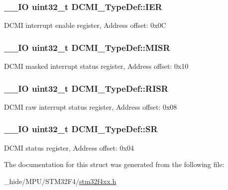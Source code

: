 \subsubsection[{I\+E\+R}]{\setlength{\rightskip}{0pt plus 5cm}\+\_\+\+\_\+\+I\+O uint32\+\_\+t D\+C\+M\+I\+\_\+\+Type\+Def\+::\+I\+E\+R}\label{struct_d_c_m_i___type_def_a91ce93b57d8382147574c678ee497c63}
D\+C\+M\+I interrupt enable register, Address offset\+: 0x0\+C \hypertarget{struct_d_c_m_i___type_def_ab367c4ca2e8ac87238692e6d55d622ec}{}
\subsubsection[{M\+I\+S\+R}]{\setlength{\rightskip}{0pt plus 5cm}\+\_\+\+\_\+\+I\+O uint32\+\_\+t D\+C\+M\+I\+\_\+\+Type\+Def\+::\+M\+I\+S\+R}\label{struct_d_c_m_i___type_def_ab367c4ca2e8ac87238692e6d55d622ec}
D\+C\+M\+I masked interrupt status register, Address offset\+: 0x10 \hypertarget{struct_d_c_m_i___type_def_ae0aba9f38498cccbe0186b7813825026}{}
\subsubsection[{R\+I\+S\+R}]{\setlength{\rightskip}{0pt plus 5cm}\+\_\+\+\_\+\+I\+O uint32\+\_\+t D\+C\+M\+I\+\_\+\+Type\+Def\+::\+R\+I\+S\+R}\label{struct_d_c_m_i___type_def_ae0aba9f38498cccbe0186b7813825026}
D\+C\+M\+I raw interrupt status register, Address offset\+: 0x08 \hypertarget{struct_d_c_m_i___type_def_a1bbe4b3cc5d9552526bec462b42164d5}{}
\subsubsection[{S\+R}]{\setlength{\rightskip}{0pt plus 5cm}\+\_\+\+\_\+\+I\+O uint32\+\_\+t D\+C\+M\+I\+\_\+\+Type\+Def\+::\+S\+R}\label{struct_d_c_m_i___type_def_a1bbe4b3cc5d9552526bec462b42164d5}
D\+C\+M\+I status register, Address offset\+: 0x04 

The documentation for this struct was generated from the following file\+:\begin{DoxyCompactItemize}
\item 
\+\_\+hide/\+M\+P\+U/\+S\+T\+M32\+F4/\hyperlink{stm32f4xx_8h}{stm32f4xx.\+h}\end{DoxyCompactItemize}

